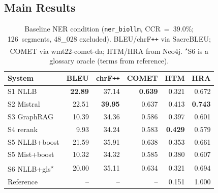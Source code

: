 \documentclass[11pt,a4paper,twocolumn]{article}
\begin{document}
\subsection{Main Results}

\begin{table}[!ht]
\centering
\footnotesize
\setlength{\tabcolsep}{3pt}
\begin{tabular}{lrrrrr}
\toprule
System & BLEU & chrF\texttt{++} & COMET & HTM & HRA \\
\midrule
S1 NLLB       & \textbf{22.89} & 37.14 & \textbf{0.639} & 0.321 & 0.672 \\
S2 Mistral    & 22.51 & \textbf{39.95} & 0.637 & 0.413 & \textbf{0.743} \\
S3 GraphRAG   & 10.39 & 34.36 & 0.586 & 0.397 & 0.601 \\
S4 rerank     &  9.93 & 34.24 & 0.583 & \textbf{0.429} & 0.579 \\
S5 NLLB+boost & 21.59 & 35.91 & 0.638 & 0.353 & 0.661 \\
S5 Mist+boost & 10.32 & 34.32 & 0.585 & 0.380 & 0.607 \\
S6 NLLB+gls\textsuperscript{$\star$} & 20.00 & 35.11 & 0.634 & 0.321 & 0.694 \\
\midrule
Reference     & --   & --   & --   & 0.151 & 1.000 \\
\bottomrule
\end{tabular}
\caption{Baseline NER condition (\texttt{ner\_biollm}, CCR~=~39.0\%;
126~segments, 48\_028 excluded). BLEU/chrF\texttt{++} via SacreBLEU;
COMET via wmt22-comet-da; HTM/HRA from Neo4j.
\textsuperscript{$\star$}S6 is a glossary oracle (terms from reference).}
\label{tab:biollm}
\end{table}
\end{document}
